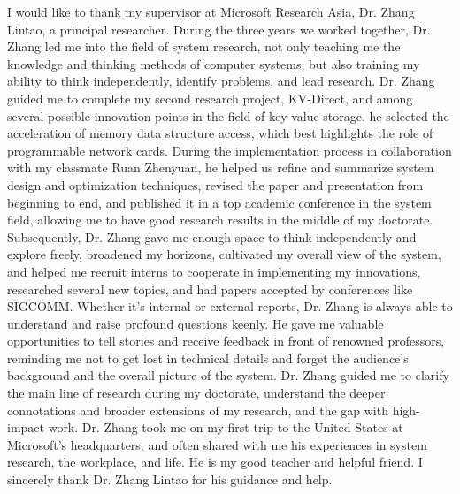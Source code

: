 \begin{acknowledgements}
I would like to thank my supervisor at Microsoft Research Asia, Dr. Zhang Lintao, a principal researcher. During the three years we worked together, Dr. Zhang led me into the field of system research, not only teaching me the knowledge and thinking methods of computer systems, but also training my ability to think independently, identify problems, and lead research. Dr. Zhang guided me to complete my second research project, KV-Direct, and among several possible innovation points in the field of key-value storage, he selected the acceleration of memory data structure access, which best highlights the role of programmable network cards. During the implementation process in collaboration with my classmate Ruan Zhenyuan, he helped us refine and summarize system design and optimization techniques, revised the paper and presentation from beginning to end, and published it in a top academic conference in the system field, allowing me to have good research results in the middle of my doctorate. Subsequently, Dr. Zhang gave me enough space to think independently and explore freely, broadened my horizons, cultivated my overall view of the system, and helped me recruit interns to cooperate in implementing my innovations, researched several new topics, and had papers accepted by conferences like SIGCOMM. Whether it's internal or external reports, Dr. Zhang is always able to understand and raise profound questions keenly. He gave me valuable opportunities to tell stories and receive feedback in front of renowned professors, reminding me not to get lost in technical details and forget the audience's background and the overall picture of the system. Dr. Zhang guided me to clarify the main line of research during my doctorate, understand the deeper connotations and broader extensions of my research, and the gap with high-impact work. Dr. Zhang took me on my first trip to the United States at Microsoft's headquarters, and often shared with me his experiences in system research, the workplace, and life. He is my good teacher and helpful friend. I sincerely thank Dr. Zhang Lintao for his guidance and help.


\end{acknowledgements}
